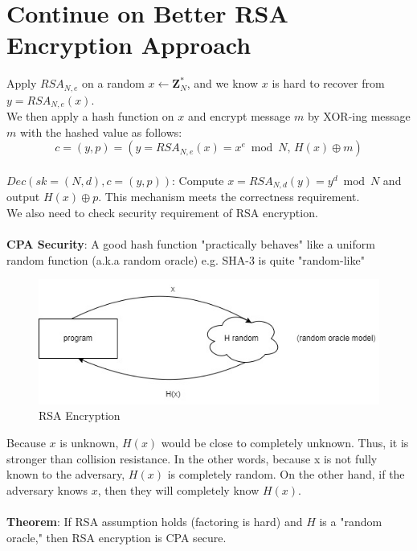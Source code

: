 \documentclass{scribe}
\begin{document}
\maketitle


\section{Continue on Better RSA Encryption Approach}
Apply $RSA_{N,e}$ on a random $x \leftarrow \mathbf{Z}_N^*$, and we know $x$ is hard to recover from $y=RSA_{N,e}(x)$.
\\
We then apply a hash function on $x$ and encrypt message $m$ by XOR-ing message $m$ with the hashed value as follows:
\[c = (y,p) = (y=RSA_{N,e}(x) = x^e \bmod N\text{, }H(x) \oplus m)\]  
\\
$Dec(sk=(N,d), c=(y,p))$: Compute $x=RSA_{N,d}(y) = y ^d \bmod N$ and output $H(x) \oplus p$. This mechanism meets the correctness requirement.
\vspace{8mm}
\\
We also need to check security requirement of RSA encryption.
\\\\
\textbf{CPA Security}: A good hash function "practically behaves" like a uniform random function (a.k.a random oracle) e.g. SHA-3 is quite "random-like"
\\
\begin{figure}[H]
    \centering
    \includegraphics[scale=0.5]{rsa_encryption.jpg}
    \caption{RSA Encryption}
\end{figure}
\noindent Because $x$ is unknown, $H(x)$ would be close to completely unknown. Thus, it is stronger than collision resistance. In the other words, because x is not fully known to the adversary, $H(x)$ is completely random. On the other hand, if the adversary knows $x$, then they will completely know $H(x)$.
\\\\
\textbf{Theorem}: If RSA assumption holds (factoring is hard) and $H$ is a "random oracle," then RSA encryption is CPA secure. 
\vspace{10mm}
\end{document}
